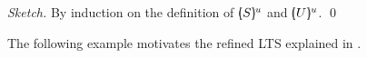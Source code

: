 \begin{proof}[Sketch]
	By induction on the definition of $[\!\!(S)\!\!]^{u}$
	and $[\!\!(U)\!\!]^{u}$. 
	\qed
\end{proof}

The following example motivates the refined 
LTS explained in .




